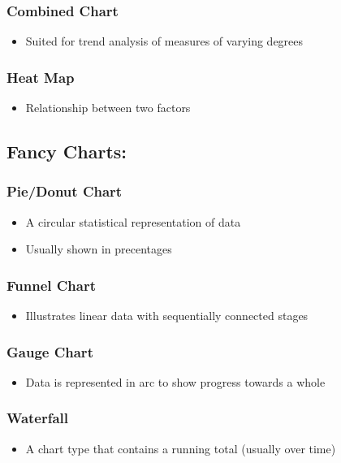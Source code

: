 \documentclass[a5paper]{article}
\begin{document}
	\subsubsection{Combined Chart}
	\begin{itemize}
		\item Suited for trend analysis of measures of varying degrees
	\end{itemize}
	\subsubsection{Heat Map}
	\begin{itemize}
		\item Relationship between two factors
	\end{itemize}
	\subsection{Fancy Charts:}
	\subsubsection{Pie/Donut Chart}
	\begin{itemize}
		\item A circular statistical representation of data
		\item Usually shown in precentages
	\end{itemize}
	\subsubsection{Funnel Chart}
	\begin{itemize}
		\item Illustrates linear data with sequentially connected stages
	\end{itemize}
	\subsubsection{Gauge Chart}
	\begin{itemize}
		\item Data is represented in arc to show progress towards a whole
	\end{itemize}
	\subsubsection{Waterfall}
	\begin{itemize}
		\item A chart type that contains a running total (usually over time)
	\end{itemize}
\end{document}
